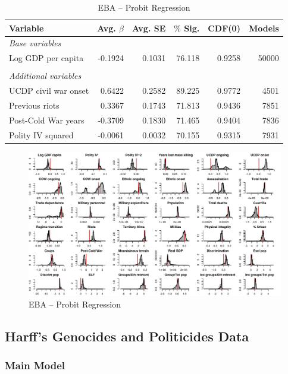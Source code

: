 \documentclass[a4paper,12pt]{article}
\begin{document}
\begin{table}[H]
\centering
\begin{tabular}{lrrrrr}
\hline
\textbf{Variable} & \textbf{Avg. $\beta$} & \textbf{Avg. SE} & \textbf{$\%$ Sig.} & \textbf{CDF(0)} & \textbf{Models} \\ \hline
\textit{Base variables} &  &  &  &  &  \\
Log GDP per capita & -0.1924 & 0.1031 & 76.118 & 0.9258 & 50000 \\
 &  &  &  &  &  \\
\textit{Additional variables} &  &  &  &  &  \\
UCDP civil war onset & 0.6422 & 0.2582 & 89.225 & 0.9772 & 4501 \\
Previous riots & 0.3367 & 0.1743 & 71.813 & 0.9436 & 7851 \\
Post-Cold War years & -0.3709 & 0.1830 & 71.465 & 0.9404 & 7836 \\
Polity IV squared & -0.0061 & 0.0032 & 70.155 & 0.9315 & 7931 \\ \hline
\end{tabular}
\caption{EBA -- Probit Regression}
\label{tab:eba1}
\end{table}

\begin{figure}
    \centering
    \includegraphics[width=.98\textheight,angle=90]{images/mk-probit.pdf}
    \caption{EBA -- Probit Regression}
    \label{fig:mk-probit}
\end{figure}

\subsection{Harff's Genocides and Politicides Data}
\label{sec:harff}

\subsubsection{Main Model}
\end{document}
